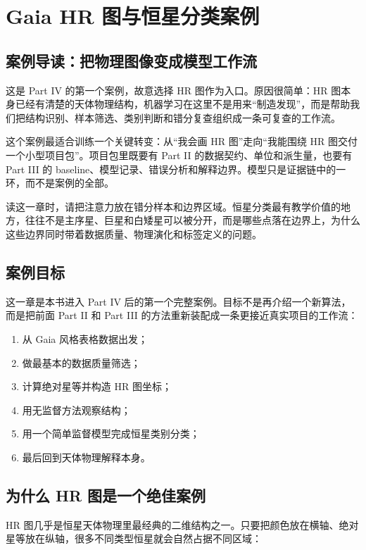 \chapter{Gaia HR 图与恒星分类案例}

\section{案例导读：把物理图像变成模型工作流}

这是 Part IV 的第一个案例，故意选择 HR 图作为入口。原因很简单：HR 图本身已经有清楚的天体物理结构，机器学习在这里不是用来“制造发现”，而是帮助我们把结构识别、样本筛选、类别判断和错分复查组织成一条可复查的工作流。

这个案例最适合训练一个关键转变：从“我会画 HR 图”走向“我能围绕 HR 图交付一个小型项目包”。项目包里既要有 Part II 的数据契约、单位和派生量，也要有 Part III 的 baseline、模型记录、错误分析和解释边界。模型只是证据链中的一环，而不是案例的全部。

读这一章时，请把注意力放在错分样本和边界区域。恒星分类最有教学价值的地方，往往不是主序星、巨星和白矮星可以被分开，而是哪些点落在边界上，为什么这些边界同时带着数据质量、物理演化和标签定义的问题。

\section{案例目标}

这一章是本书进入 Part IV 后的第一个完整案例。目标不是再介绍一个新算法，而是把前面 Part II 和 Part III 的方法重新装配成一条更接近真实项目的工作流：

\begin{enumerate}
    \item 从 Gaia 风格表格数据出发；
    \item 做最基本的数据质量筛选；
    \item 计算绝对星等并构造 HR 图坐标；
    \item 用无监督方法观察结构；
    \item 用一个简单监督模型完成恒星类别分类；
    \item 最后回到天体物理解释本身。
\end{enumerate}

\section{为什么 HR 图是一个绝佳案例}

HR 图几乎是恒星天体物理里最经典的二维结构之一。只要把颜色放在横轴、绝对星等放在纵轴，很多不同类型恒星就会自然占据不同区域：

